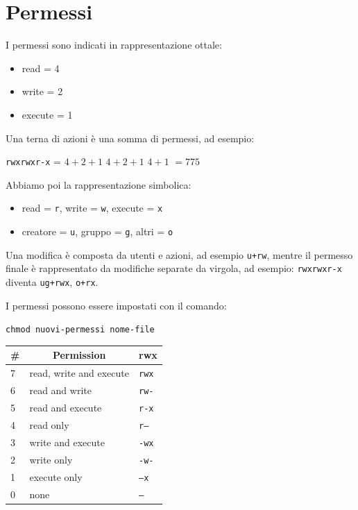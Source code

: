 \section{Permessi}
I permessi sono indicati in rappresentazione ottale:
\begin{itemize}
    \item read = 4
    \item write = 2
    \item execute = 1
\end{itemize}
Una terna di azioni è una somma di permessi, ad esempio:
\begin{center}
    \texttt{rwxrwxr-x} = \(4+2+1\) \(4+2+1\) \(4+1\) \(= 775\)
\end{center}
Abbiamo poi la rappresentazione simbolica:
\begin{itemize}
    \item read = \texttt{r}, write = \texttt{w}, execute = \texttt{x}
    \item creatore = \texttt{u}, gruppo = \texttt{g}, altri = \texttt{o}
\end{itemize}
Una modifica è composta da utenti e azioni, ad esempio \texttt{u+rw}, mentre il permesso finale è rappresentato da modifiche separate da virgola, ad esempio: \texttt{rwxrwxr-x} diventa \texttt{ug+rwx}, \texttt{o+rx}.

I permessi possono essere impostati con il comando:
\begin{center}
    \texttt{chmod nuovi-permessi nome-file}
\end{center}

\begin{table}[hbtp!]
\centering
\begin{tabular}{lll} 
\hline
\multicolumn{1}{c}{\textbf{\#}} & \multicolumn{1}{c}{\textbf{Permission}} & \multicolumn{1}{c}{\textbf{rwx}}  \\ 
\hline
7                               & read, write and execute                 & \texttt{rwx}                             \\
6                               & read and write                          & \texttt{rw-}                               \\
5                               & read and execute                        & \texttt{r-x}                               \\
4                               & read only                               & \texttt{r--}                               \\
3                               & write and execute                       & \texttt{-wx}                               \\
2                               & write only                              & \texttt{-w-}                               \\
1                               & execute only                            & \texttt{--x}                               \\
0                               & none                                    & \texttt{---}                              
\end{tabular}
\end{table}
\FloatBarrier

